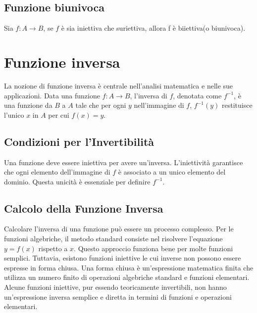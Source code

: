 \documentclass{book}
\begin{document}
\begin{definition}
    \subsection{Funzione biunivoca}
    Sia \(f:A \rightarrow B\), se \(f\) è sia iniettiva che suriettiva, allora f è biiettiva(o biunivoca).
\end{definition}
\section{Funzione inversa}

La nozione di funzione inversa è centrale nell'analisi matematica e nelle sue applicazioni. Data una funzione \( f: A \rightarrow B \), l'inversa di \( f \), denotata come \( f^{-1} \), è una funzione da \( B \) a \( A \) tale che per ogni \( y \) nell'immagine di \( f \), \( f^{-1}(y) \) restituisce l'unico \( x \) in \( A \) per cui \( f(x) = y \).

\subsection{Condizioni per l'Invertibilità}
Una funzione deve essere iniettiva per avere un'inversa. L'iniettività garantisce che ogni elemento dell'immagine di \( f \) è associato a un unico elemento del dominio. Questa unicità è essenziale per definire \( f^{-1} \).

\subsection{Calcolo della Funzione Inversa}
Calcolare l'inversa di una funzione può essere un processo complesso. Per le funzioni algebriche, il metodo standard consiste nel risolvere l'equazione \( y = f(x) \) rispetto a \( x \). Questo approccio funziona bene per molte funzioni semplici. Tuttavia, esistono funzioni iniettive le cui inverse non possono essere espresse in forma chiusa. Una forma chiusa è un'espressione matematica finita che utilizza un numero finito di operazioni algebriche standard e funzioni elementari. Alcune funzioni iniettive, pur essendo teoricamente invertibili, non hanno un'espressione inversa semplice e diretta in termini di funzioni e operazioni elementari.
\end{document}
